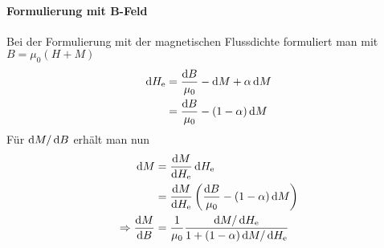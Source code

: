 \documentclass{scrartcl}
\newcommand{\He}{H_\text{e}}
\begin{document}
\paragraph{Formulierung mit B-Feld} Bei der Formulierung mit der magnetischen Flussdichte formuliert man mit $B = \mu_0(H + M)$
\begin{align}
	\dif \He &= \frac{\dif B}{\mu_0} - \dif M + \alpha \dif M \\
		&= \frac{\dif B}{\mu_0} - (1 - \alpha) \dif M
\end{align}
Für $\mathop{}\!\mathrm{d} M/\mathop{}\!\mathrm{d} B$ erhält man nun
\begin{align}
	\dif M &= \frac{\dif M}{\dif \He} \dif \He \\
	&=\frac{\dif M}{\dif \He}\left(\frac{\dif B}{\mu_0} - (1 - \alpha) \dif M\right) \\
	\Rightarrow \frac{\dif M}{\dif B} &= \frac{1}{\mu_0}\frac{\dif M/\dif \He}{1 + (1-\alpha) \dif M/\dif \He}
\end{align}
\end{document}
